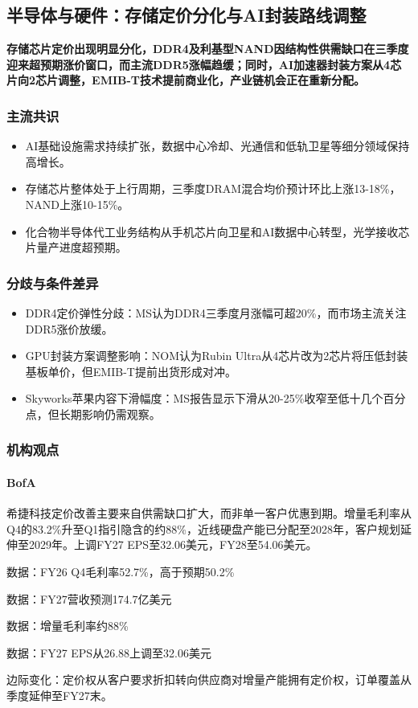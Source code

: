 \documentclass[11pt]{ctexart}
\begin{document}
\subsection{半导体与硬件：存储定价分化与AI封装路线调整}
\textbf{存储芯片定价出现明显分化，DDR4及利基型NAND因结构性供需缺口在三季度迎来超预期涨价窗口，而主流DDR5涨幅趋缓；同时，AI加速器封装方案从4芯片向2芯片调整，EMIB-T技术提前商业化，产业链机会正在重新分配。}
\subsubsection*{主流共识}
\begin{itemize}
  \item AI基础设施需求持续扩张，数据中心冷却、光通信和低轨卫星等细分领域保持高增长。
  \item 存储芯片整体处于上行周期，三季度DRAM混合均价预计环比上涨13-18\%，NAND上涨10-15\%。
  \item 化合物半导体代工业务结构从手机芯片向卫星和AI数据中心转型，光学接收芯片量产进度超预期。
\end{itemize}
\subsubsection*{分歧与条件差异}
\begin{itemize}
  \item DDR4定价弹性分歧：MS认为DDR4三季度月涨幅可超20\%，而市场主流关注DDR5涨价放缓。
  \item GPU封装方案调整影响：NOM认为Rubin Ultra从4芯片改为2芯片将压低封装基板单价，但EMIB-T提前出货形成对冲。
  \item Skyworks苹果内容下滑幅度：MS报告显示下滑从20-25\%收窄至低十几个百分点，但长期影响仍需观察。
\end{itemize}
\subsubsection*{机构观点}
\paragraph{BofA} 希捷科技定价改善主要来自供需缺口扩大，而非单一客户优惠到期。增量毛利率从Q4的83.2\%升至Q1指引隐含的约88\%，近线硬盘产能已分配至2028年，客户规划延伸至2029年。上调FY27 EPS至32.06美元，FY28至54.06美元。
{\small\color{refgray}数据：FY26 Q4毛利率52.7\%，高于预期50.2\%\par}
{\small\color{refgray}数据：FY27营收预测174.7亿美元\par}
{\small\color{refgray}数据：增量毛利率约88\%\par}
{\small\color{refgray}数据：FY27 EPS从26.88上调至32.06美元\par}
{\small\color{refgray}边际变化：定价权从客户要求折扣转向供应商对增量产能拥有定价权，订单覆盖从季度延伸至FY27末。\par}
\end{document}
